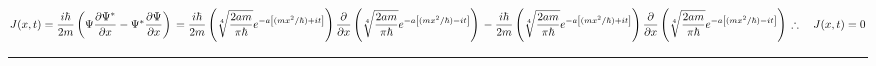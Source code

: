 \documentclass[fleqn]{article}
\begin{document}
\begin{itemize}
      \textcolor{hwColor}{
        $
          J(x,t)=\dfrac{i \hbar}{2m} \left(\Psi \dfrac{\partial \Psi^*}{\partial x}-\Psi^* \dfrac{\partial \Psi}{\partial x}\right) \\
          \\
          \\
          =\dfrac{i \hbar}{2m}\left(\sqrt[4]{\dfrac{2am}{\pi \hbar}}e^{-a\left[(mx^2/\hbar)+it\right]}\right) \dfrac{\partial}{\partial x} \left(\sqrt[4]{\dfrac{2am}{\pi \hbar}}e^{-a\left[(mx^2/\hbar)-it\right]}\right) \\ \\
          -\dfrac{i \hbar}{2m}\left(\sqrt[4]{\dfrac{2am}{\pi \hbar}}e^{-a\left[(mx^2/\hbar)+it\right]}\right) \dfrac{\partial}{\partial x} \left(\sqrt[4]{\dfrac{2am}{\pi \hbar}}e^{-a\left[(mx^2/\hbar)-it\right]}\right)
          \\
          \\
          \\
          \therefore ~~~  J(x,t)=0
        $
      }

  \end{itemize}

  \rule{15cm}{1pt}
\end{document}

